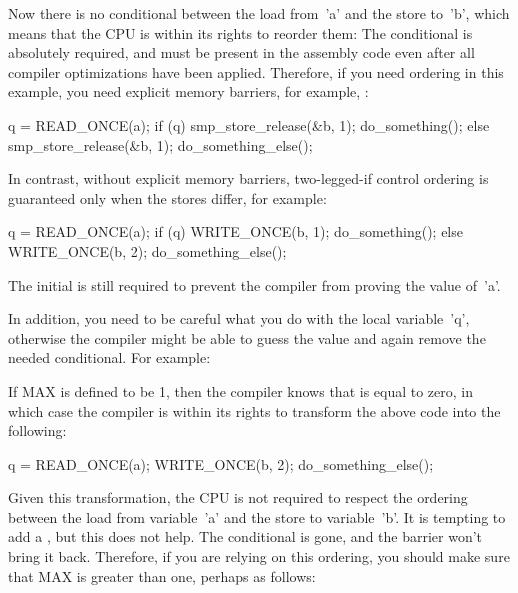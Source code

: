 Now there is no conditional between the load from~'a' and the store
to~'b', which means that the CPU is within its rights to reorder them:
The conditional is absolutely required, and must be present in the
assembly code even after all compiler optimizations have been applied.
Therefore, if you need ordering in this example, you need explicit
memory barriers, for example, :

\begin{VerbatimU}
	q = READ_ONCE(a);
	if (q) {
		smp_store_release(&b, 1);
		do_something();
	} else {
		smp_store_release(&b, 1);
		do_something_else();
	}
\end{VerbatimU}

In contrast, without explicit memory barriers, two-legged-if control
ordering is guaranteed only when the stores differ, for example:

\begin{VerbatimU}
	q = READ_ONCE(a);
	if (q) {
		WRITE_ONCE(b, 1);
		do_something();
	} else {
		WRITE_ONCE(b, 2);
		do_something_else();
	}
\end{VerbatimU}

The initial  is still required to prevent the compiler from
proving the value of~'a'.

In addition, you need to be careful what you do with the local variable~'q',
otherwise the compiler might be able to guess the value and again remove
the needed conditional.  For example:


If MAX is defined to be 1, then the compiler knows that  is
equal to zero, in which case the compiler is within its rights to
transform the above code into the following:

\begin{VerbatimU}
	q = READ_ONCE(a);
	WRITE_ONCE(b, 2);
	do_something_else();
\end{VerbatimU}

Given this transformation, the CPU is not required to respect the ordering
between the load from variable~'a' and the store to variable~'b'.
It is tempting to add a , but this does not help.
The conditional is gone, and the barrier won't bring it back.
Therefore, if you are relying on this ordering, you should make sure that
MAX is greater than one, perhaps as follows:

